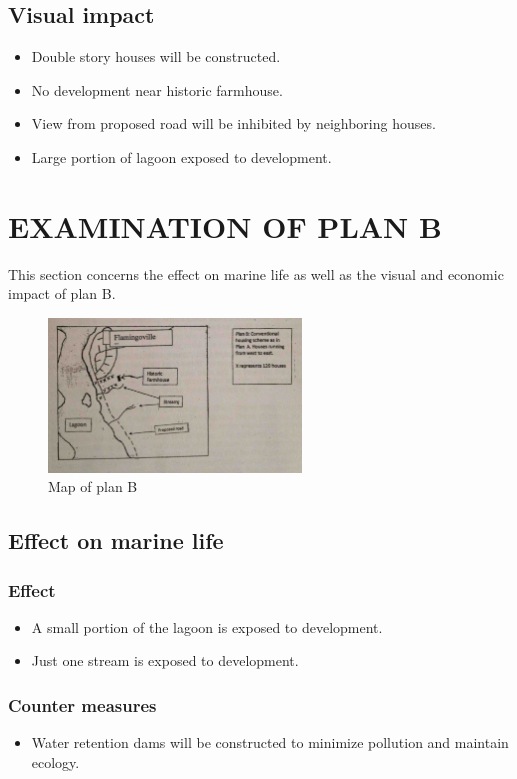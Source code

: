\documentclass{article}
\begin{document}
\subsection{Visual impact}
\begin{itemize}
	\item Double story houses will be constructed.
	\item No development near historic farmhouse.
	\item View from proposed road will be inhibited by neighboring houses.
	\item Large portion of lagoon exposed to development.
\end{itemize}

\newpage
\section{EXAMINATION OF PLAN B}
This section concerns the effect on marine life as well as the visual and economic impact of plan B.

\begin{figure}[h!]
	\centering
	\includegraphics[width=0.6\textwidth]{plan_b}
	\caption{Map of plan B}
\end{figure}

\subsection{Effect on marine life}
\subsubsection{Effect}
\begin{itemize}
	\item A small portion of the lagoon is exposed to development.
	\item Just one stream is exposed to development.
\end{itemize}

\subsubsection{Counter measures}
\begin{itemize}
	\item Water retention dams will be constructed to minimize pollution and maintain ecology.
\end{itemize}
\end{document}
